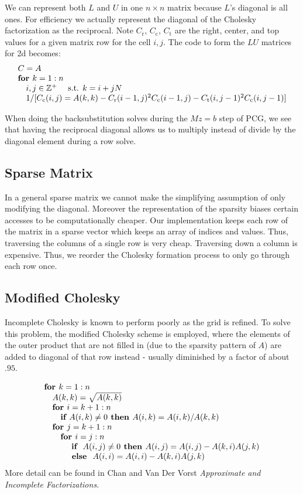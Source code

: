 \documentclass{article}
\newcommand{\pkeyword}[1]{\textbf{#1 }}
\newcommand{\pif}{\pkeyword{if}}
\newcommand{\pthen}{\pkeyword{ then}}
\newcommand{\pelse}{\pkeyword{ else}}
\newcommand{\pindent}{\textrm{\quad}}
\newcommand{\pfor}{\pkeyword{for}}
\begin{document}
We can represent both $L$ and $U$ in one $n\times n$ matrix because $L$'s diagonal is all ones. For efficiency we actually represent the diagonal of
the Cholesky factorization as the reciprocal.  Note $C_\textrm{r}$, $C_\textrm{c}$, $C_\textrm{t}$ are the right, center, and top values for a given
matrix row for the cell $i,j$. The code to form the $LU$ matrices for 2d becomes:
$$\begin{array}{ll}
C=A\\
\pfor k=1:n\\
\pindent i,j\in\mathbb{Z^+} \textrm{ \quad s.t. } k=i+jN\\
\pindent 1/[C_\textrm{c}(i,j)=A(k,k)-C_\textrm{r}(i-1,j)^2 C_\textrm{c}(i-1,j) -C_\textrm{t}(i,j-1)^2C_\textrm{c}(i,j-1)]\\
\end{array}$$

When doing the backsubstitution solves during the $Mz=b$ step of PCG, we see that having the reciprocal diagonal allows us to multiply instead of
divide by the diagonal element during a row solve.


\subsection{Sparse Matrix}

In a general sparse matrix we cannot make the simplifying assumption of only modifying the diagonal.  Moreover the representation of the sparsity
biases certain accesses to be computationally cheaper.  Our implementation keeps each row of the matrix in a sparse vector which keeps an array of
indices and values. Thus, traversing the columns of a single row is very cheap.  Traversing down a column is expensive. Thus, we reorder the Cholesky
formation process to only go through each row once.

\subsection{Modified Cholesky}

Incomplete Cholesky is known to perform poorly as the grid is refined.  To solve this problem, the modified Cholesky scheme is employed, where the
elements of the outer product that are not filled in (due to the sparsity pattern of $A$) are added to diagonal of that row instead - usually
diminished by a factor of about $.95$.

$$\begin{array}{ll}
\pfor k=1:n\\
\pindent A(k,k)=\sqrt{A(k,k)}\\
\pindent \pfor i=k+1:n \\
\pindent \pindent \pif A(i,k) \ne 0 \pthen A(i,k)=A(i,k)/A(k,k)\\
\pindent\pfor j=k+1:n\\
\pindent\pindent\pfor i=j:n\\
\pindent\pindent\pindent\,\, \pif\ A(i,j)\ne 0 \pthen
A(i,j)=A(i,j)-A(k,i) A(j,k)\\
\pindent\pindent\pindent\pelse\ A(i,i)=A(i,i)-A(k,i)A(j,k)\\
\end{array}$$
More detail can be found in Chan and Van Der Vorst \emph{Approximate and Incomplete Factorizations}.
\end{document}
